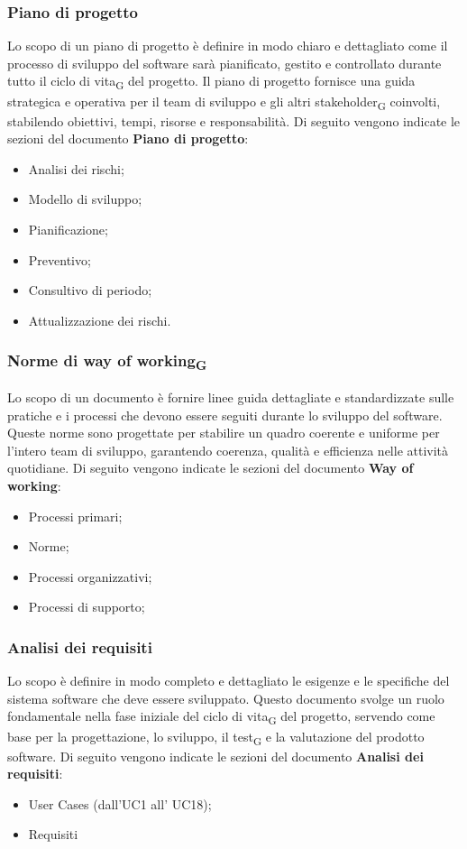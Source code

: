 \documentclass{article}
\begin{document}
\subsubsection*{\textbf{Piano di progetto}}
Lo scopo di un piano di progetto è definire in modo chiaro e dettagliato come il processo di sviluppo del software sarà pianificato, gestito e controllato durante tutto il ciclo di vita\textsubscript{G} del progetto. Il piano di progetto fornisce una guida strategica e operativa per il team di sviluppo e gli altri stakeholder\textsubscript{G} coinvolti, stabilendo obiettivi, tempi, risorse e responsabilità. Di seguito vengono indicate le sezioni del documento \textbf{Piano di progetto}:\begin{itemize}
    \item Analisi dei rischi;
    \item Modello di sviluppo;
    \item Pianificazione;
    \item Preventivo;
    \item Consultivo di periodo;
    \item Attualizzazione dei rischi.
\end{itemize}

\subsubsection*{Norme di way of working\textsubscript{G}}
Lo scopo di un documento  è fornire linee guida dettagliate e standardizzate sulle pratiche e i processi che devono essere seguiti durante lo sviluppo del software. Queste norme sono progettate per stabilire un quadro coerente e uniforme per l'intero team di sviluppo, garantendo coerenza, qualità e efficienza nelle attività quotidiane. Di seguito vengono indicate le sezioni del documento \textbf{Way of working}:\begin{itemize}
    \item Processi primari;
    \item Norme;
    \item Processi organizzativi;
    \item Processi di supporto;
\end{itemize}

\subsubsection*{Analisi dei requisiti}
Lo scopo è definire in modo completo e dettagliato le esigenze e le specifiche del sistema software che deve essere sviluppato. Questo documento svolge un ruolo fondamentale nella fase iniziale del ciclo di vita\textsubscript{G} del progetto, servendo come base per la progettazione, lo sviluppo, il test\textsubscript{G} e la valutazione del prodotto software.
Di seguito vengono indicate le sezioni del documento \textbf{Analisi dei requisiti}:\begin{itemize}
    \item User Cases (dall'UC1 all' UC18);
    \item Requisiti
\end{itemize}
\end{document}
